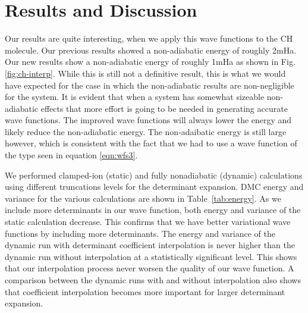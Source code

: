\documentclass[aip,jcp,numerical,reprint]{revtex4-1}
\begin{document}
\section{Results and Discussion}



Our results are quite interesting, when we apply this wave functions to the CH molecule.  Our previous results showed a non-adiabatic energy of roughly 2mHa. Our new results show a non-adiabatic energy of roughly 1mHa as shown in Fig.\ref{fig:ch-interp}.  While this is still not a definitive result, this is what we would have expected for the case in which the non-adiabatic results are non-negligible for the system.  It is evident that when a system has somewhat sizeable non-adiabatic effects that more effort is going to be needed in generating accurate wave functions.  The improved wave functions will always lower the energy and likely reduce the non-adiabatic energy.  The non-adaibatic energy is still large however, which is consistent with the fact that we had to use a wave function of the type seen in equation \eqref{eqn:wfs3}.

We performed clamped-ion (static) and fully nonadiabatic (dynamic) calculations using different truncations levels for the determinant expansion. DMC energy and variance for the various calculations are shown in Table~\ref{tab:energy}. As we include more determinants in our wave function, both energy and variance of the static calculation decrease. This confirms that we have better variational wave functions by including more determinants. The energy and variance of the dynamic run with determinant coefficient interpolation is never higher than the dynamic run without interpolation at a statistically significant level. This shows that our interpolation process never worsen the quality of our wave function. A comparison between the dynamic runs with and without interpolation also shows that coefficient interpolation becomes more important for larger determinant expansion.
\end{document}
